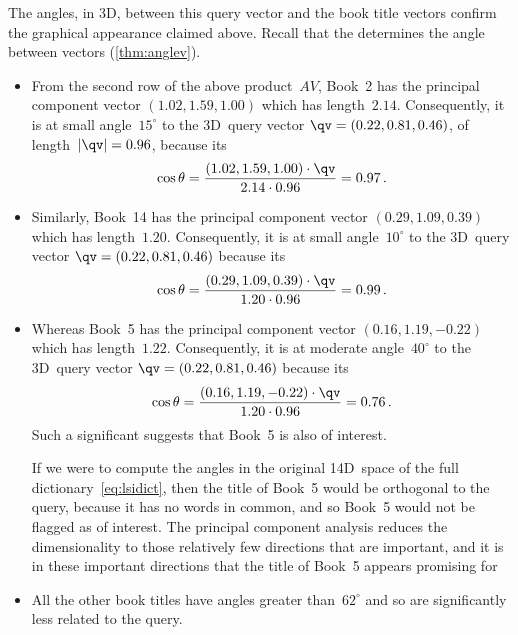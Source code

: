 The angles, in 3D, between this query vector and the book title vectors confirm the graphical appearance claimed above.
Recall that the  determines the angle between vectors (\cref{thm:anglev}).
\begin{itemize}
\item From the second row of the above product~\(AV\), Book~2 has the principal component vector \((1.02,1.59,1.00)\) which has length~\(2.14\).
Consequently, it is at small angle~\(15^\circ\) to the 3D~query vector \(\qv=(0.22,0.81,0.46)\), of length~\(|\qv|=0.96\), because its 
\begin{equation*}
\cos\theta=\frac{(1.02,1.59,1.00)\cdot\qv}{2.14\cdot0.96}
=0.97\,.
\end{equation*}

\item Similarly, Book~14 has the principal component vector \((0.29,1.09,0.39)\) which has length~\(1.20\).
Consequently, it is at small angle~\(10^\circ\) to the 3D~query vector \(\qv=(0.22,0.81,0.46)\) because its 
\begin{equation*}
\cos\theta=\frac{(0.29,1.09,0.39)\cdot\qv}{1.20\cdot0.96}
=0.99\,.
\end{equation*}

\item Whereas Book~5 has the principal component vector \((0.16,1.19,-0.22)\) which has length~\(1.22\).
Consequently, it is at moderate angle~\(40^\circ\) to the 3D~query vector \(\qv=(0.22,0.81,0.46)\) because its 
\begin{equation*}
\cos\theta=\frac{(0.16,1.19,-0.22)\cdot\qv}{1.20\cdot0.96}
=0.76\,.
\end{equation*}
Such a significant  suggests that Book~5 is also of interest.

If we were to compute the angles in the original 14D~space of the full dictionary~\eqref{eq:lsidict}, then the title of Book~5 would be orthogonal to the query, because it has no words in common, and so Book~5 would not be flagged as of interest.
The principal component analysis reduces the dimensionality to those relatively few directions that are important, and it is in these important directions that the title of Book~5 appears promising for 

\item All the other book titles have angles greater than~\(62^\circ\) and so are significantly less related to the query.
\end{itemize}



